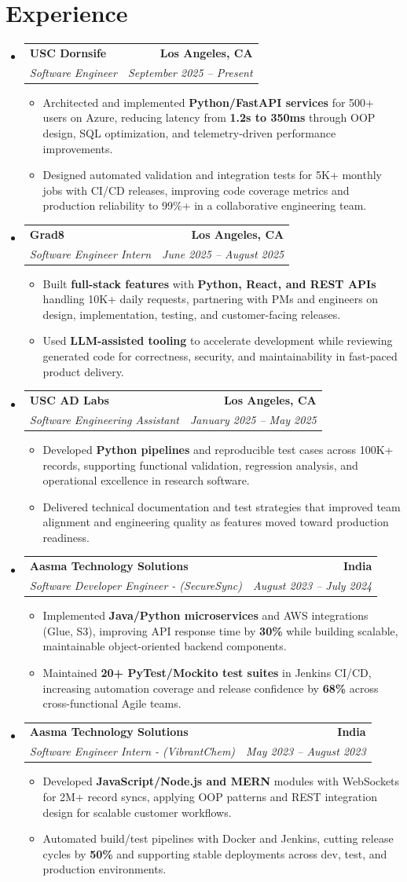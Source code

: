 \documentclass[letterpaper,10pt]{article}
\makeatletter
\newcommand{\resumeItem}[1]{\item\small{{#1 \vspace{-2pt}}}}
\newcommand{\resumeSubheading}[4]{\vspace{-1pt}\item\begin{tabular*}{1.0\textwidth}[t]{l@{\extracolsep{\fill}}r}\textbf{#1} & \textbf{\small #2} \\\textit{\small#3} & \textit{\small #4} \\\end{tabular*}\vspace{-2pt}}
\newcommand{\resumeSubHeadingListStart}{\begin{itemize}[leftmargin=0.0in, label={}]}
\newcommand{\resumeSubHeadingListEnd}{\end{itemize}}
\newcommand{\resumeItemListStart}{\begin{itemize}[leftmargin=0.15in,label=\textbullet,itemsep=2pt,topsep=0pt,parsep=0pt,partopsep=0pt]}
\newcommand{\resumeItemListEnd}{\end{itemize}\vspace{-4pt}}
\makeatother
\begin{document}
\section{Experience}
\resumeSubHeadingListStart
\resumeSubheading{USC Dornsife}{Los Angeles, CA}{Software Engineer}{September 2025 -- Present}
\resumeItemListStart
\resumeItem{Architected and implemented \textbf{Python/FastAPI services} for 500+ users on Azure, reducing latency from \textbf{1.2s to 350ms} through OOP design, SQL optimization, and telemetry-driven performance improvements.}
\resumeItem{Designed automated validation and integration tests for 5K+ monthly jobs with CI/CD releases, improving code coverage metrics and production reliability to 99\%+ in a collaborative engineering team.}
\resumeItemListEnd
\resumeSubheading{Grad8}{Los Angeles, CA}{Software Engineer Intern}{June 2025 -- August 2025}
\resumeItemListStart
\resumeItem{Built \textbf{full-stack features} with \textbf{Python, React, and REST APIs} handling 10K+ daily requests, partnering with PMs and engineers on design, implementation, testing, and customer-facing releases.}
\resumeItem{Used \textbf{LLM-assisted tooling} to accelerate development while reviewing generated code for correctness, security, and maintainability in fast-paced product delivery.}
\resumeItemListEnd
\resumeSubheading{USC AD Labs}{Los Angeles, CA}{Software Engineering Assistant}{January 2025 -- May 2025}
\resumeItemListStart
\resumeItem{Developed \textbf{Python pipelines} and reproducible test cases across 100K+ records, supporting functional validation, regression analysis, and operational excellence in research software.}
\resumeItem{Delivered technical documentation and test strategies that improved team alignment and engineering quality as features moved toward production readiness.}
\resumeItemListEnd
\resumeSubheading{Aasma Technology Solutions}{India}{Software Developer Engineer - (SecureSync)}{August 2023 -- July 2024}
\resumeItemListStart
\resumeItem{Implemented \textbf{Java/Python microservices} and AWS integrations (Glue, S3), improving API response time by \textbf{30\%} while building scalable, maintainable object-oriented backend components.}
\resumeItem{Maintained \textbf{20+ PyTest/Mockito test suites} in Jenkins CI/CD, increasing automation coverage and release confidence by \textbf{68\%} across cross-functional Agile teams.}
\resumeItemListEnd
\resumeSubheading{Aasma Technology Solutions}{India}{Software Engineer Intern - (VibrantChem)}{May 2023 -- August 2023}
\resumeItemListStart
\resumeItem{Developed \textbf{JavaScript/Node.js and MERN} modules with WebSockets for 2M+ record syncs, applying OOP patterns and REST integration design for scalable customer workflows.}
\resumeItem{Automated build/test pipelines with Docker and Jenkins, cutting release cycles by \textbf{50\%} and supporting stable deployments across dev, test, and production environments.}
\resumeItemListEnd
\resumeSubHeadingListEnd
\vspace{-14pt}
\end{document}
